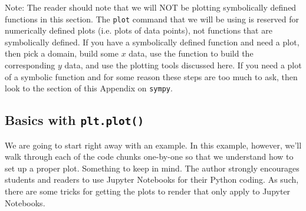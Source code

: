Note: The reader should note that we will NOT be plotting symbolically defined functions
in this section.  The \texttt{plot} command that we will be using is reserved for numerically
defined plots (i.e. plots of data points), not functions that are symbolically defined.
If you have a symbolically defined function and need a plot, then pick a domain, build
some $x$ data, use the function to build the corresponding $y$ data, and use the plotting
tools discussed here.  If you need a plot of a symbolic function and for some reason these
steps are too much to ask, then look to the section of this Appendix on \texttt{sympy}.


\subsection{Basics with \texttt{plt.plot()}}
We are going to start right away with an example.  In this example, however, we'll walk
through each of the code chunks one-by-one so that we understand how to set up a proper
plot.  Something to keep in mind.  The author strongly encourages students and readers to
use Jupyter Notebooks for their Python coding.  As such, there are some tricks for getting
the plots to render that only apply to Jupyter Notebooks.

